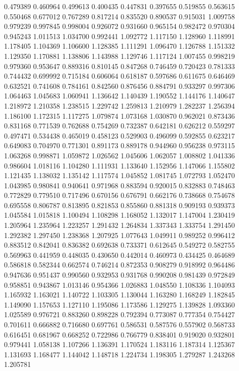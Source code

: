 0.479389
0.460964
0.499613
0.400435
0.447831
0.397655
0.519855
0.563615
0.550468
0.677012
0.767289
0.817214
0.835520
0.890537
0.915031
1.009758
0.979239
0.997845
0.998004
0.926072
0.931660
0.965154
0.982472
0.970304
0.945243
1.011513
1.034700
0.992441
1.092772
1.117150
1.128960
1.118991
1.178405
1.104369
1.106600
1.128385
1.111291
1.096470
1.126788
1.151332
1.129350
1.170881
1.138806
1.143988
1.129746
1.117124
1.007455
0.998219
0.979360
0.953647
0.889316
0.810145
0.847268
0.746459
0.720423
0.781333
0.744432
0.699992
0.715184
0.606064
0.618187
0.597686
0.611675
0.646469
0.632521
0.741608
0.784161
0.842560
0.876456
0.884791
0.933297
0.997306
1.064463
1.045683
1.060941
1.136642
1.140439
1.190552
1.144176
1.140647
1.218972
1.210358
1.238515
1.229742
1.259813
1.210979
1.282237
1.256394
1.186100
1.172315
1.117275
1.079874
1.073168
1.030870
0.962021
0.873436
0.831168
0.771539
0.762688
0.754269
0.732387
0.642181
0.626212
0.559297
0.497471
0.534438
0.465019
0.458123
0.529903
0.496099
0.592855
0.623217
0.649083
0.704970
0.771301
0.891173
0.889178
0.944960
0.956238
0.973115
1.063268
0.998871
1.059872
1.026562
1.045606
1.062057
1.008802
1.041336
0.986604
1.018116
1.104280
1.111931
1.133640
1.152956
1.147066
1.155802
1.121435
1.138032
1.135142
1.117574
1.045852
1.081745
1.072793
1.052470
1.043985
0.980841
0.940641
0.971968
0.883594
0.920015
0.832883
0.748463
0.772829
0.779510
0.717496
0.670156
0.676791
0.662176
0.738668
0.754678
0.695558
0.806787
0.813895
0.821853
0.855860
0.881318
0.909193
0.939373
1.045584
1.015818
1.100494
1.108298
1.168052
1.132017
1.147004
1.230419
1.205964
1.235964
1.223257
1.291432
1.264834
1.337343
1.333754
1.291450
1.292382
1.297450
1.238368
1.207925
1.077643
1.049911
0.989252
0.996412
0.883512
0.842041
0.836382
0.692638
0.733371
0.612645
0.549272
0.582755
0.569963
0.441959
0.448035
0.430650
0.442014
0.460973
0.434425
0.464689
0.586818
0.582344
0.662574
0.746214
0.872353
0.908279
0.918992
0.964486
0.947636
0.951437
0.990560
0.932953
0.931768
0.990208
0.981439
0.972849
0.958851
0.943867
1.013146
0.954366
1.026883
1.048550
1.108336
1.104093
1.165932
1.163021
1.140722
1.103305
1.130044
1.163280
1.168249
1.182845
1.149090
1.157653
1.127110
1.195086
1.173586
1.129275
1.139828
1.093360
1.025589
0.976721
0.883260
0.898228
0.792394
0.773087
0.777354
0.754427
0.701611
0.666882
0.716680
0.697761
0.586531
0.587576
0.557902
0.568733
0.616451
0.681967
0.668252
0.722986
0.766779
0.838401
0.919020
0.932801
0.979441
1.058138
1.107266
1.136391
1.170524
1.183116
1.187314
1.125367
1.131693
1.168477
1.144042
1.148718
1.224734
1.198305
1.279287
1.243268
1.205781
